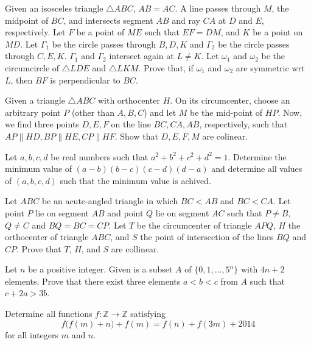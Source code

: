 \documentclass[11pt]{scrartcl}
\begin{document}
\begin{problem}[1620616963605432410]
Given an isosceles triangle $\triangle ABC$, $AB=AC$. A line passes through $M$, the midpoint of $BC$, and intersects segment $AB$ and ray $CA$ at $D$ and $E$, respectively. Let $F$ be a point of $ME$ such that $EF=DM$, and $K$ be a point on $MD$. Let $\Gamma_1$ be the circle passes through $B,D,K$ and $\Gamma_2$ be the circle passes through $C,E,K$. $\Gamma_1$ and $\Gamma_2$ intersect again at $L \neq K$. Let $\omega_1$ and $\omega_2$ be the circumcircle of $\triangle LDE$ and $\triangle LKM$. Prove that, if $\omega_1$ and $\omega_2$ are symmetric wrt $L$, then $BF$ is perpendicular to $BC$.
\end{problem}
\begin{problem}[296367141382799]
Given a triangle $ \triangle{ABC} $ with orthocenter $ H $. On its circumcenter, choose an arbitrary point $ P $ (other than $ A,B,C $) and let $ M $ be the mid-point of $ HP $. Now, we find three points $ D,E,F $ on the line $ BC, CA, AB $, respectively, such that $ AP \parallel HD, BP \parallel HE, CP \parallel HF $. Show that $ D, E, F, M $ are colinear.
\end{problem}
\begin{problem}[15317350224055]
Let $a,b,c,d$ be real numbers such that $a^2+b^2+c^2+d^2=1$. Determine the minimum value of $(a-b)(b-c)(c-d)(d-a)$ and determine all values of $(a,b,c,d)$ such that the minimum value is achived.
\end{problem}
\begin{problem}[597832355221478]
Let $ABC$ be an acute-angled triangle in which $BC<AB$ and $BC<CA$. Let point $P$ lie on segment $AB$ and point $Q$ lie on segment $AC$ such that $P \neq B$, $Q \neq C$ and $BQ = BC = CP$. Let $T$ be the circumcenter of triangle $APQ$, $H$ the orthocenter of triangle $ABC$, and $S$ the point of intersection of the lines $BQ$ and $CP$. Prove that $T$, $H$, and $S$ are collinear.
\end{problem}
\begin{problem}[80567267310692]
Let $n$ be a positive integer. Given is a subset $A$ of $\{0,1,...,5^n\}$ with $4n+2$ elements. Prove that there exist three elements $a<b<c$ from $A$ such that $c+2a>3b$.
\end{problem}
\begin{problem}[262105369827306]
	Determine all functions $f: \mathbb{Z}\to\mathbb{Z}$ satisfying\[f\big(f(m)+n\big)+f(m)=f(n)+f(3m)+2014\]for all integers $m$ and $n$.
\end{problem}
\end{document}
